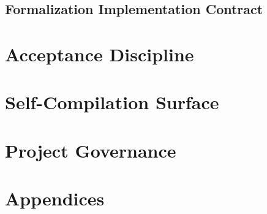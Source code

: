 \documentclass[11pt,oneside,openany]{book}
\begin{document}
\chapter{Formalization Implementation Contract}

\part{Acceptance Discipline}

\part{Self-Compilation Surface}

\part{Project Governance}

\appendix
\part{Appendices}


\end{document}
